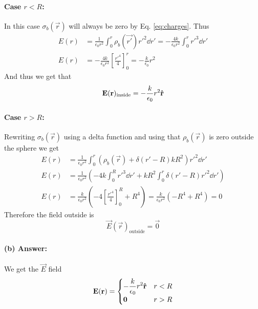 \paragraph{Case $r < R$:} In this case $\sigma_b(\vec{r})$ will always be zero by Eq. \eqref{eq:charges}. Thus
\begin{align}
    E(r) &= \frac{1}{\epsilon_0 r^2} \int_{0}^{r}\rho_b(\vec{r'})r'^2 \dd r' = -\frac{4k}{\epsilon_0 r^2} \int_{0}^{r}r'^3 \dd r'\\
    E(r) &= -\frac{4k}{\epsilon_0 r^2} \left[\frac{r'^4}{4}\right]_0^r = -\frac{k}{\epsilon_0} r^2
\end{align}
And thus we get that 
\begin{equation}
    \mathbf{E}(\mathbf{r})_\text{inside} = -\frac{k}{\epsilon_0} r^2 \mathbf{\hat{r}}
\end{equation}

\paragraph{Case $r > R$:} Rewriting $\sigma_b(\vec{r})$ using a delta function and using that $\rho_b(\vec{r})$ is zero outside the sphere we get
\begin{align}
    E(r) &= \frac{1}{\epsilon_0 r^2} \int_{0}^{r} (\rho_b(\vec{r}) + \delta(r' - R)kR^2)r'^2 \dd r'\\
    E(r) &= \frac{1}{\epsilon_0 r^2} \left( -4k\int_{0}^{R}r'^3 \dd r' + kR^2\int_{0}^{r} \delta(r' - R)r'^2 \dd r'\right)\\
    E(r) &= \frac{k}{\epsilon_0 r^2} \left( -4\left[\frac{r'^4}{4}\right]_0^R + R^4 \right) = \frac{k}{\epsilon_0 r^2} (-R^4 + R^4) = 0
\end{align}
Therefore the field outside is
\begin{equation}
    \vec{E}(\vec{r})_\text{outside} = \vec{0}
\end{equation}

\paragraph{(b) Answer:} We get the $\vec{E}$ field 
\begin{equation}
    \mathbf{E}(\mathbf{r}) = \begin{cases}\displaystyle
        -\frac{k}{\epsilon_0} r^2 \mathbf{\hat{r}} & r < R\\
        \mathbf{0} & r>R
    \end{cases}
\end{equation}

